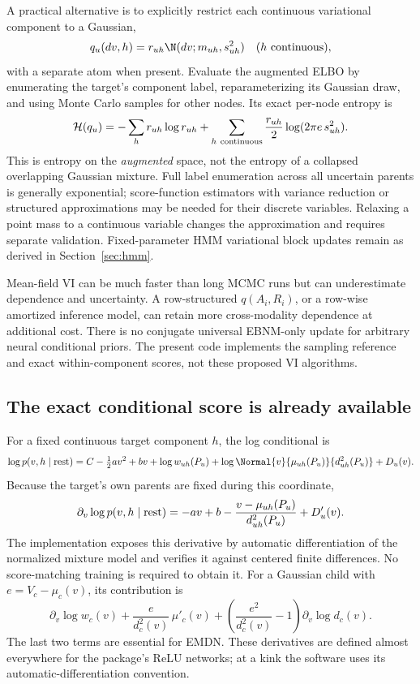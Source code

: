 A practical alternative is to explicitly restrict each continuous
variational component to a Gaussian,
\[
q_u(dv,h)=r_{uh}\N(dv;m_{uh},s_{uh}^2)
\quad(h\ {\rm continuous}),
\]
with a separate atom when present. Evaluate the augmented ELBO by
enumerating the target's component label, reparameterizing its Gaussian
draw, and using Monte Carlo samples for other nodes. Its exact per-node
entropy is
\[
\mathcal H(q_u)=-\sum_h r_{uh}\log r_{uh}
+\sum_{h\ {\rm continuous}}\frac{r_{uh}}2
       \log(2\pi e\,s_{uh}^2).
\]
This is entropy on the \emph{augmented} space, not the entropy of a
collapsed overlapping Gaussian mixture. Full label enumeration across
all uncertain parents is generally exponential; score-function
estimators with variance reduction or structured approximations may be
needed for their discrete variables. Relaxing a point mass to a
continuous variable changes the approximation and requires separate
validation. Fixed-parameter HMM variational block updates remain as
derived in Section~\ref{sec:hmm}.

Mean-field VI can be much faster than long MCMC runs but can underestimate
dependence and uncertainty. A row-structured \(q(A_i,R_i)\), or a
row-wise amortized inference model, can retain more cross-modality
dependence at additional cost. There is no conjugate universal
EBNM-only update for arbitrary neural conditional priors. The present
code implements the sampling reference and exact within-component
scores, not these proposed VI algorithms.

\subsection{The exact conditional score is already available}
For a fixed continuous target component \(h\), the log conditional is
\[
\log p(v,h\mid{\rm rest})=C-\tfrac12av^2+bv
+\log w_{uh}(P_u)+\log\Normal{v}{\mu_{uh}(P_u)}{d_{uh}^2(P_u)}
+D_u(v).
\]
Because the target's own parents are fixed during this coordinate,
\begin{equation}
\partial_v\log p(v,h\mid{\rm rest})
=-av+b-\frac{v-\mu_{uh}(P_u)}{d_{uh}^2(P_u)}
+D'_u(v).
\label{eq:exactscore}
\end{equation}
The implementation exposes this derivative by automatic differentiation
of the normalized mixture model and verifies it against centered finite
differences. No score-matching training is required to obtain it.
For a Gaussian child with \(e=V_c-\mu_c(v)\), its contribution is
\begin{equation}
\partial_v\log w_c(v)
+\frac{e}{d_c^2(v)}\,\mu'_c(v)
+\left(\frac{e^2}{d_c^2(v)}-1\right)
   \partial_v\log d_c(v).
\label{eq:childscore}
\end{equation}
The last two terms are essential for EMDN. These derivatives are defined
almost everywhere for the package's ReLU networks; at a kink the software
uses its automatic-differentiation convention.

